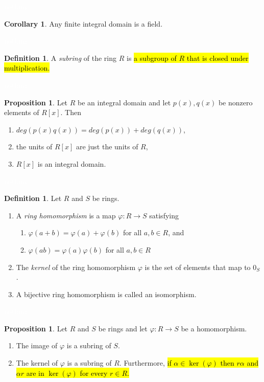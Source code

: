 \documentclass{article}
\theoremstyle{definition}
\newtheorem{prop}[thm]{Proposition}
\newtheorem{cor}[thm]{Corollary}
\newtheorem{defn}[thm]{Definition}
\newcommand{\nl}{\textcolor{white}{nothing}}
\newcommand{\ra}{\rightarrow}
\newcommand{\al}{\alpha}
\newcommand{\vphi}{\varphi}
\begin{document}
\nl

\begin{cor}
Any finite integral domain is a field.
\end{cor}

\nl

\begin{defn}
A \textit{subring} of the ring $R$ is \hl{a subgroup of $R$ that is closed under multiplication.}
\end{defn}

\nl

\begin{prop}
Let $R$ be an integral domain and let $p(x), q(x)$ be nonzero elements of $R[x]$. Then
\begin{enumerate}
\item $deg(p(x)q(x)) = deg (p(x)) + deg(q(x))$,
\item the units of $R[x]$ are just the units of $R$,
\item $R[x]$ is an integral domain.
\end{enumerate}
\end{prop}

\nl

\begin{defn}
Let $R$ and $S$ be rings.
\begin{enumerate}
\item A \textit{ring homomorphism} is a map $\vphi: R\ra S$ satisfying
\begin{enumerate}
\item $\vphi(a+b) = \vphi(a)+\vphi(b)$ for all $a,b\in R$, and 
\item $\vphi(ab) = \vphi(a)\vphi(b)$ for all $a,b\in R$
\end{enumerate}
\item The \textit{kernel} of the ring homomorphism $\vphi$ is the set of elements that map to $0_S$.
\item A bijective ring homomorphism is called an isomorphism.
\end{enumerate}
\end{defn}

\nl

\begin{prop}
Let $R$ and $S$ be rings and let $\vphi:R\ra S$ be a homomorphism.
\begin{enumerate}
\item The image of $\vphi$ is a subring of $S$.
\item The kernel of $\vphi$ is a subring of $R$. Furthermore, \hl{if $\al\in\ker(\vphi)$ then $r\al$ and $\al r$ are in $\ker(\vphi)$ for every $r\in R$.}
\end{enumerate}
\end{prop}
\end{document}
